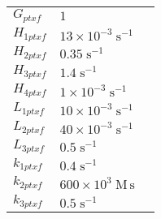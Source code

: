 \documentclass[a4paper,10.0pt]{article}
\begin{document}
{\begin{longtabu}{| l l l |}
  $G_{ptxf}$\hspace{0.5cm} & $1$\hspace{0.5cm} & \hspace{0.5cm}\\
  $H_{1 ptxf}$\hspace{0.5cm} & $13\!\times\!10 ^{-3}\;\mathrm{s}^{-1}$\hspace{0.5cm} & \hspace{0.5cm}\\
  $H_{2 ptxf}$\hspace{0.5cm} & $0.35\;\mathrm{s}^{-1}$\hspace{0.5cm} & \hspace{0.5cm}\\
  $H_{3 ptxf}$\hspace{0.5cm} & $1.4\;\mathrm{s}^{-1}$\hspace{0.5cm} & \hspace{0.5cm}\\
  $H_{4 ptxf}$\hspace{0.5cm} & $1\!\times\!10 ^{-3}\;\mathrm{s}^{-1}$\hspace{0.5cm} & \hspace{0.5cm}\\
  $L_{1 ptxf}$\hspace{0.5cm} & $10\!\times\!10 ^{-3}\;\mathrm{s}^{-1}$\hspace{0.5cm} & \hspace{0.5cm}\\
  $L_{2 ptxf}$\hspace{0.5cm} & $40\!\times\!10 ^{-3}\;\mathrm{s}^{-1}$\hspace{0.5cm} & \hspace{0.5cm}\\
  $L_{3 ptxf}$\hspace{0.5cm} & $0.5\;\mathrm{s}^{-1}$\hspace{0.5cm} & \hspace{0.5cm}\\
  $k_{1 ptxf}$\hspace{0.5cm} & $0.4\;\mathrm{s}^{-1}$\hspace{0.5cm} & \hspace{0.5cm}\\
  $k_{2 ptxf}$\hspace{0.5cm} & $600\!\times\!10 ^{3}\;\mathrm{M}\,\mathrm{s}$\hspace{0.5cm} & \hspace{0.5cm}\\
  $k_{3 ptxf}$\hspace{0.5cm} & $0.5\;\mathrm{s}^{-1}$\hspace{0.5cm} & \hspace{0.5cm}\\

\end{longtabu}}
\end{document}
